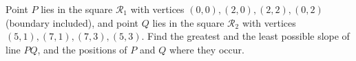 Point $P$ lies in the square $\mathcal R_1$ with vertices $(0,0),(2,0),(2,2),(0,2)$ (boundary included), and point $Q$ lies in the square $\mathcal R_2$ with vertices $(5,1),(7,1),(7,3),(5,3)$. Find the greatest and the least possible slope of line $PQ$, and the positions of $P$ and $Q$ where they occur.
